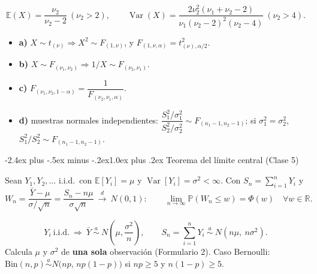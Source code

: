 \documentclass[10pt,a4paper]{article}
\makeatletter
\newcommand{\E}{\mathbb{E}}
\newcommand{\Prob}{\mathbb{P}}
\newcommand{\R}{\mathbb{R}}
\newcommand{\Var}{\operatorname{Var}}
\newcommand{\adist}{\overset{a}{\sim}}
\newcommand{\dto}{\xrightarrow{\;d\;}}
\renewcommand\section{\@startsection{section}{1}{0pt}%
  {-2.4ex plus -.5ex minus -.2ex}{1.0ex plus .2ex}%
  {\normalfont\large\bfseries\color{seccolor}}}
\makeatother
\begin{document}
\begin{thmbox}[frametitle={Momentos}]
\[
\E(X)=\frac{\nu_2}{\nu_2-2}\ (\nu_2>2),\qquad
\Var(X)=\frac{2\nu_2^2(\nu_1+\nu_2-2)}{\nu_1(\nu_2-2)^2(\nu_2-4)}\ (\nu_2>4).
\]
\end{thmbox}

\begin{thmbox}[frametitle={Resultados a)–d)}]
\begin{itemize}
  \item \textbf{a)} $X\sim t_{(\nu)}\Rightarrow X^2\sim F_{(1,\nu)}$, y
        $F_{(1,\nu,\alpha)}=t_{(\nu),\alpha/2}^2$.
  \item \textbf{b)} $X\sim F_{(\nu_1,\nu_2)}\Rightarrow 1/X\sim F_{(\nu_2,\nu_1)}$.
  \item \textbf{c)} $F_{(\nu_1,\nu_2,1-\alpha)}=\dfrac{1}{F_{(\nu_2,\nu_1,\alpha)}}$.
  \item \textbf{d)} muestras normales independientes:
        $\dfrac{S_1^2/\sigma_1^2}{S_2^2/\sigma_2^2}\sim F_{(n_1-1,n_2-1)}$; si
        $\sigma_1^2=\sigma_2^2$, $S_1^2/S_2^2\sim F_{(n_1-1,n_2-1)}$.
\end{itemize}
\end{thmbox}

\section{Teorema del límite central \textmd{(Clase 5)}}

\begin{thmbox}[frametitle={Teorema 5 (TLC)}]
Sean $Y_1,Y_2,\dots$ i.i.d.\ con $\E[Y_i]=\mu$ y $\Var[Y_i]=\sigma^2<\infty$.
Con $S_n=\sum_{i=1}^n Y_i$ y
\[
W_n=\frac{\bar Y-\mu}{\sigma/\sqrt n}=\frac{S_n-n\mu}{\sigma\sqrt n}\ \dto\ N(0,1):
\qquad
\lim_{n\to\infty}\Prob(W_n\le w)=\Phi(w)\quad\forall w\in\R .
\]
\end{thmbox}

\begin{notebox}[frametitle={Formas equivalentes (en la práctica, para $n$ grande)}]
\[
Y_i\ \text{i.i.d.}\ \Longrightarrow\
\bar Y\ \adist\ N\!\left(\mu,\frac{\sigma^2}{n}\right),\qquad
S_n=\sum_{i=1}^n Y_i\ \adist\ N\!\left(n\mu,\ n\sigma^2\right).
\]
Calcula $\mu$ y $\sigma^2$ de \textbf{una sola} observación (Formulario 2). Caso
Bernoulli: $\text{Bin}(n,p)\adist N\big(np,\,np(1-p)\big)$ si $np\ge5$ y
$n(1-p)\ge5$.
\end{notebox}
\end{document}
